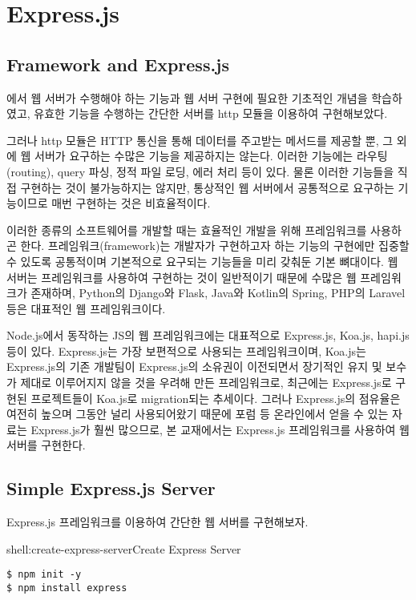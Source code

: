 \section{Express.js}\label{sect:express-js}

\subsection*{Framework and Express.js}

에서 웹 서버가 수행해야 하는 기능과 웹 서버 구현에 필요한 기초적인 개념을 학습하였고, 유효한 기능을 수행하는 간단한 서버를 http 모듈을 이용하여 구현해보았다.

그러나 http 모듈은 HTTP 통신을 통해 데이터를 주고받는 메서드를 제공할 뿐, 그 외에 웹 서버가 요구하는 수많은 기능을 제공하지는 않는다. 이러한 기능에는 라우팅(routing), query 파싱, 정적 파일 로딩, 에러 처리 등이 있다. 물론 이러한 기능들을 직접 구현하는 것이 불가능하지는 않지만, 통상적인 웹 서버에서 공통적으로 요구하는 기능이므로 매번 구현하는 것은 비효율적이다.

이러한 종류의 소프트웨어를 개발할 때는 효율적인 개발을 위해 프레임워크를 사용하곤 한다. 프레임워크(framework)는 개발자가 구현하고자 하는 기능의 구현에만 집중할 수 있도록 공통적이며 기본적으로 요구되는 기능들을 미리 갖춰둔 기본 뼈대이다. 웹 서버는 프레임워크를 사용하여 구현하는 것이 일반적이기 때문에 수많은 웹 프레임워크가 존재하며, Python의 Django와 Flask, Java와 Kotlin의 Spring, PHP의 Laravel 등은 대표적인 웹 프레임워크이다.

Node.js에서 동작하는 JS의 웹 프레임워크에는 대표적으로 Express.js, Koa.js, hapi.js 등이 있다. Express.js는 가장 보편적으로 사용되는 프레임워크이며, Koa.js는 Express.js의 기존 개발팀이 Express.js의 소유권이 이전되면서 장기적인 유지 및 보수가 제대로 이루어지지 않을 것을 우려해 만든 프레임워크로, 최근에는 Express.js로 구현된 프로젝트들이 Koa.js로 migration되는 추세이다. 그러나 Express.js의 점유율은 여전히 높으며 그동안 널리 사용되어왔기 때문에 포럼 등 온라인에서 얻을 수 있는 자료는 Express.js가 훨씬 많으므로, 본 교재에서는 Express.js 프레임워크를 사용하여 웹 서버를 구현한다.

\subsection*{Simple Express.js Server}

Express.js 프레임워크를 이용하여 간단한 웹 서버를 구현해보자.

\begin{shellenv}{shell:create-express-server}{Create Express Server}\begin{verbatim}
$ npm init -y
$ npm install express
\end{verbatim}
\end{shellenv}

